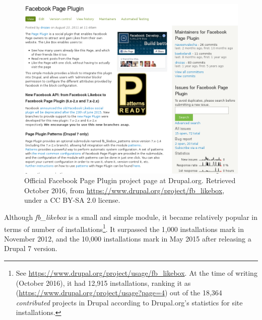 \begin{figure}[H]
    \centering
    \includegraphics[scale=0.42]{img/online/fb_likebox.png}
     \caption[Facebook Page Plugin project page at Drupal.org]%
     {Official Facebook Page Plugin project page at Drupal.org. Retrieved  October 2016, from \url{https://www.drupal.org/project/fb_likebox}, under a CC BY-SA 2.0 license.}
     \label{fb_likebox}
\end{figure}

Although \textit{fb\_likebox} is a small and simple module, it became relatively popular in terms of number of installations\footnote{See \url{https://www.drupal.org/project/usage/fb_likebox}. At the time of writing (October 2016), it had 12,915 installations, ranking it as  (\url{https://www.drupal.org/project/usage?page=4}) out of the 18,364 \textit{contributed} projects in Drupal according to Drupal.org's statistics for site installations.}. It surpassed the 1,000 installations mark in November 2012, and the 10,000 installations mark in May 2015 after releasing a Drupal 7 version.

